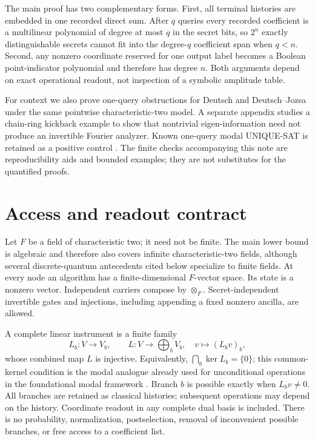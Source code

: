 \documentclass[11pt]{article}
\begin{document}
The main proof has two complementary forms. First, all terminal histories are embedded in one recorded direct sum. After $q$ queries every recorded coefficient is a multilinear polynomial of degree at most $q$ in the secret bits, so $2^n$ exactly distinguishable secrets cannot fit into the degree-$q$ coefficient span when $q<n$. Second, any nonzero coordinate reserved for one output label becomes a Boolean point-indicator polynomial and therefore has degree $n$. Both arguments depend on exact operational readout, not inspection of a symbolic amplitude table.

For context we also prove one-query obstructions for Deutsch and Deutsch--Jozsa under the same pointwise characteristic-two model. A separate appendix studies a chain-ring kickback example to show that nontrivial eigen-information need not produce an invertible Fourier analyzer. Known one-query modal UNIQUE-SAT is retained as a positive control \cite{WillcockSabry2011}. The finite checks accompanying this note are reproducibility aids and bounded examples; they are not substitutes for the quantified proofs.

\section{Access and readout contract}\label{sec:contract}
Let $F$ be a field of characteristic two; it need not be finite. The main lower bound is algebraic and therefore also covers infinite characteristic-two fields, although several discrete-quantum antecedents cited below specialize to finite fields. At every node an algorithm has a finite-dimensional $F$-vector space. Its state is a nonzero vector. Independent carriers compose by $\otimes_F$. Secret-independent invertible gates and injections, including appending a fixed nonzero ancilla, are allowed.

A complete linear instrument is a finite family
\[
 L_b:V\longrightarrow V_b,\qquad
 L:V\longrightarrow\bigoplus_bV_b,\quad v\longmapsto (L_bv)_b,
\]
whose combined map $L$ is injective. Equivalently, $\bigcap_b\ker L_b=\{0\}$; this common-kernel condition is the modal analogue already used for unconditional operations in the foundational modal framework \cite{Schumacher2012}. Branch $b$ is possible exactly when $L_bv\ne0$. All branches are retained as classical histories; subsequent operations may depend on the history. Coordinate readout in any complete dual basis is included. There is no probability, normalization, postselection, removal of inconvenient possible branches, or free access to a coefficient list.
\end{document}
